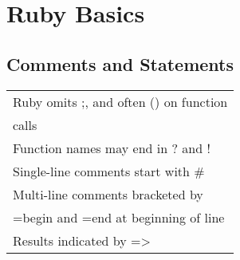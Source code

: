 \section{Ruby Basics}
\subsection*{Comments and Statements}
\begin{tabular}{ l }
\rowcolor{Gray}
Ruby omits ;, and often () on function \\
\rowcolor{Gray}
calls \\
Function names may end in ? and ! \\
\rowcolor{Gray}
Single-line comments start with \# \\
Multi-line comments bracketed by \\
=begin and =end at beginning of line \\
\rowcolor{Gray}
Results indicated by => \\
\end{tabular}
\\

